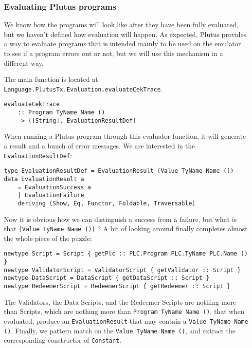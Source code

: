 \documentclass{article}
\begin{document}
\subsubsection{Evaluating Plutus programs}
We know how the programs will look like after they have been fully evaluated, but we haven't defined how evaluation will happen. As expected, Plutus provides a way to evaluate programs that is intended mainly to be used on the emulator to see if a program errors out or not, but we will use this mechanism in a different way.

The main function is located at \verb|Language.PlutusTx.Evaluation.evaluateCekTrace|.

\begin{verbatim}
evaluateCekTrace
    :: Program TyName Name ()
    -> ([String], EvaluationResultDef)
\end{verbatim}

When running a Plutus program through this evaluator function, it will generate a result and a bunch of error messages. We are interested in the \verb|EvaluationResultDef|:
\nopagebreak

\begin{verbatim}
type EvaluationResultDef = EvaluationResult (Value TyName Name ())
data EvaluationResult a
    = EvaluationSuccess a
    | EvaluationFailure
    deriving (Show, Eq, Functor, Foldable, Traversable)
\end{verbatim}

Now it is obvious how we can distinguish a success from a failure, but what is that \verb|(Value TyName Name ())| ? A bit of looking around finally completes almost the whole piece of the puzzle:
\nopagebreak

\begin{verbatim}
newtype Script = Script { getPlc :: PLC.Program PLC.TyName PLC.Name () }
newtype ValidatorScript = ValidatorScript { getValidator :: Script }
newtype DataScript = DataScript { getDataScript :: Script }
newtype RedeemerScript = RedeemerScript { getRedeemer :: Script }
\end{verbatim}

The Validators, the Data Scripts, and the Redeemer Scripts are nothing more than Scripts, which are nothing more than \verb|Program TyName Name ()|, that when evaluated, produce an \verb|EvaluationResult| that may contain a \verb|Value TyName Name ()|. Finally, we pattern match on the \verb|Value TyName Name ()|, and extract the corresponding constructor of \verb|Constant|.
\end{document}
